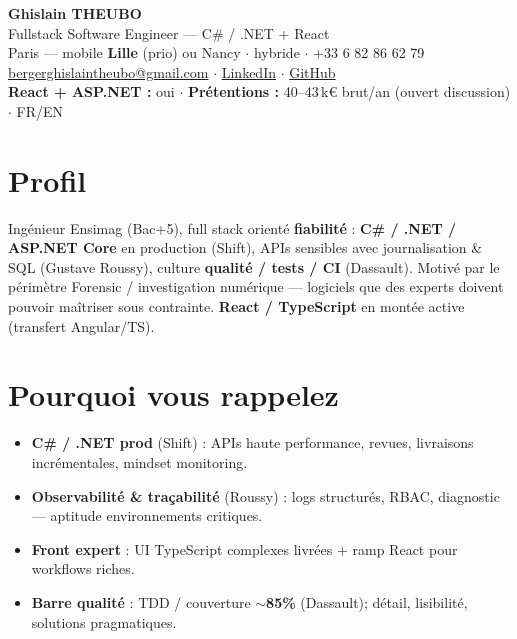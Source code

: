 \documentclass[10pt,a4paper]{article}
\begin{document}
\begin{center}
{\LARGE\bfseries Ghislain THEUBO}\\[1pt]
{\large Fullstack Software Engineer --- C\# / .NET + React}\\[2pt]
Paris --- mobile \textbf{Lille} (prio) ou Nancy $\cdot$ hybride $\cdot$ +33 6 82 86 62 79\\
\href{mailto:bergerghislaintheubo@gmail.com}{bergerghislaintheubo@gmail.com} $\cdot$
\href{https://www.linkedin.com/in/berger-ghislain}{LinkedIn} $\cdot$
\href{https://github.com/Bergerghislain}{GitHub}\\
\small\textbf{React + ASP.NET :} oui $\cdot$ \textbf{Pr\'etentions :} 40--43\,k€ brut/an (ouvert discussion) $\cdot$ FR/EN
\end{center}

\section{Profil}
Ing\'enieur Ensimag (Bac+5), full stack orient\'e \textbf{fiabilit\'e} : \textbf{C\# / .NET / ASP.NET Core} en production (Shift), APIs sensibles avec journalisation \& SQL (Gustave Roussy), culture \textbf{qualit\'e / tests / CI} (Dassault). Motiv\'e par le p\'erim\`etre Forensic / investigation num\'erique --- logiciels que des experts doivent pouvoir ma\^itriser sous contrainte. \textbf{React / TypeScript} en mont\'ee active (transfert Angular/TS).

\section{Pourquoi vous rappelez}
\begin{itemize}
  \item \textbf{C\# / .NET prod} (Shift) : APIs haute performance, revues, livraisons incr\'ementales, mindset monitoring.
  \item \textbf{Observabilit\'e \& tra\c{c}abilit\'e} (Roussy) : logs structur\'es, RBAC, diagnostic --- aptitude environnements critiques.
  \item \textbf{Front expert} : UI TypeScript complexes livr\'ees + ramp React pour workflows riches.
  \item \textbf{Barre qualit\'e} : TDD / couverture \textbf{$\sim$85\%} (Dassault); d\'etail, lisibilit\'e, solutions pragmatiques.
\end{itemize}
\end{document}
